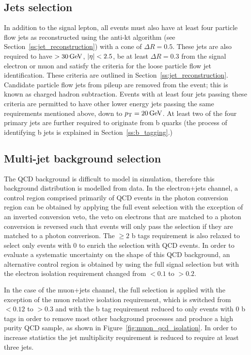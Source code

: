 \subsection{Jets selection}
\label{jets_selection}
In addition to the signal lepton, all events must also have at least four particle flow jets as reconstructed
using the anti-kt algorithm (see Section~\ref{ss:jet_reconstruction}) with a cone of $\Delta R = 0.5$. These
jets are also required to have \pt $> 30\,\text{Ge\hspace{-.08em}V}$, $|\eta| < 2.5$, be at least $\Delta R = 0.3$ from the signal
electron or muon and satisfy the criteria for the loose particle flow jet identification. These criteria are
outlined in Section~\ref{ss:jet_reconstruction}. Candidate particle flow jets from pileup are removed from the
event; this is known as charged hadron subtraction. Events with at least four jets passing these criteria are
permitted to have other lower energy jets passing the same requirements mentioned above, down to $p_{\mathrm{T}} =
20\,\text{Ge\hspace{-.08em}V}$. At least two of the four primary jets are further required to originate from b quarks (the process of
identifying b jets is explained in Section~\ref{ss:b_tagging}.)

\subsection{Multi-jet background selection}
\label{ss:background_selection}
The QCD background is difficult to model in simulation, therefore this background distribution is modelled
from data. In the electron+jets channel, a control region comprised primarily of QCD events in the
photon conversion region can be obtained by applying the full event selection with the exception of an
inverted conversion veto, \ie the veto on electrons that are matched to a photon conversion is reversed such
that events will only pass the selection if they are matched to a photon converison. The $\geq 2$ b tags
requirement is also relaxed to select only events with 0 \btags to enrich the selection with QCD events. In
order to evaluate a systematic uncertainty on the shape of this QCD background, an alternative control region is obtained by using the full signal selection but with the electron isolation requirement changed from
$< 0.1$ to $> 0.2$.

In the case of the muon+jets channel, the full selection is applied with the exception of the muon relative
isolation requirement, which is switched from $< 0.12$ to $> 0.3$ and with the b tag requirement reduced to
only events with 0 b tags in order to remove most other \ttbar background processes and produce a high purity
QCD sample, as shown in Figure~\ref{fig:muon_qcd_isolation}. In order to increase statistics the jet
multiplicity requirement is reduced to require at least three jets.

